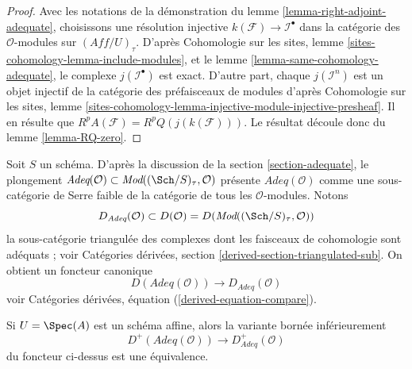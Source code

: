 \begin{proof}
Avec les notations de la démonstration du
lemme \ref{lemma-right-adjoint-adequate},
choisissons une résolution injective $k(\mathcal{F}) \to \mathcal{I}^\bullet$
dans la catégorie des $\mathcal{O}$-modules sur $(\textit{Aff}/U)_\tau$.
D'après
Cohomologie sur les sites, lemme \ref{sites-cohomology-lemma-include-modules},
et le
lemme \ref{lemma-same-cohomology-adequate},
le complexe $j(\mathcal{I}^\bullet)$ est exact.
D'autre part, chaque $j(\mathcal{I}^n)$ est un objet injectif
de la catégorie des préfaisceaux de modules d'après
Cohomologie sur les sites, lemme
\ref{sites-cohomology-lemma-injective-module-injective-presheaf}.
Il en résulte que $R^pA(\mathcal{F}) = R^pQ(j(k(\mathcal{F})))$.
Le résultat découle donc du
lemme \ref{lemma-RQ-zero}.
\end{proof}

\noindent
Soit $S$ un schéma. D'après la discussion de la
section \ref{section-adequate},
le plongement
$\textit{Adeq}(\mathcal{O}) \subset
\textit{Mod}((\Sch/S)_\tau, \mathcal{O})$
présente $\textit{Adeq}(\mathcal{O})$ comme une sous-catégorie de Serre faible de
la catégorie de tous les $\mathcal{O}$-modules. Notons
$$
D_{\textit{Adeq}}(\mathcal{O}) \subset
D(\mathcal{O}) = D(\textit{Mod}((\Sch/S)_\tau, \mathcal{O}))
$$
la sous-catégorie triangulée des complexes dont les faisceaux de cohomologie
sont adéquats ; voir
Catégories dérivées, section \ref{derived-section-triangulated-sub}.
On obtient un foncteur canonique
$$
D(\textit{Adeq}(\mathcal{O}))
\longrightarrow
D_{\textit{Adeq}}(\mathcal{O})
$$
voir
Catégories dérivées, équation (\ref{derived-equation-compare}).

\begin{lemma}
\label{lemma-bounded-below}
Si $U = \Spec(A)$ est un schéma affine, alors la variante
bornée inférieurement
\begin{equation}
\label{equation-compare-bounded-adequate}
D^+(\textit{Adeq}(\mathcal{O}))
\longrightarrow
D^+_{\textit{Adeq}}(\mathcal{O})
\end{equation}
du foncteur ci-dessus est une équivalence.
\end{lemma}

